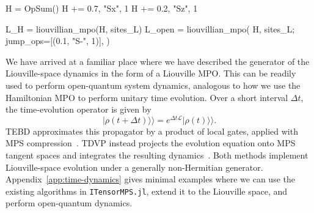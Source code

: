 %
\begin{juliacode}[
  caption={Constructing Hamiltonian and dissipative Liouville MPOs.},
  label={lst:liouvillian-construction},
]
H = OpSum()
H += 0.7, "Sx", 1
H += 0.2, "Sz", 1

L_H = liouvillian_mpo(H, sites_L)
L_open = liouvillian_mpo(
    H,
    sites_L;
    jump_ops=[(0.1, "S-", 1)],
)
\end{juliacode}
%

We have arrived at a familiar place where we have described the generator of the Liouville-space dynamics in the form of a Liouville MPO.
This can be readily used to perform open-quantum system dynamics, analogous to how we use the Hamiltonian MPO to perform unitary time evolution.
Over a short interval \(\Delta t\), the time-evolution operator is given by
%
\begin{equation}
    \lvert\rho(t+\Delta t)\rangle\!\rangle
    = e^{\Delta t\mathcal L} \lvert\rho(t)\rangle\!\rangle.
    \label{eq:liouville-time-step}
\end{equation}
%
TEBD approximates this propagator by a product of local gates, applied with MPS compression~\cite{Vidal2003,Vidal2004,ZwolakVidal2004,Paeckel2019}.
TDVP instead projects the evolution equation onto MPS tangent spaces and integrates the resulting dynamics~\cite{Haegeman2011,Haegeman2016,Paeckel2019}.
Both methods implement Liouville-space evolution under a generally non-Hermitian generator.
Appendix~\ref{app:time-dynamics} gives minimal examples where we can use the existing algorithms in \texttt{ITensorMPS.jl}, extend it to the Liouville space, and perform open-quantum dynamics.

